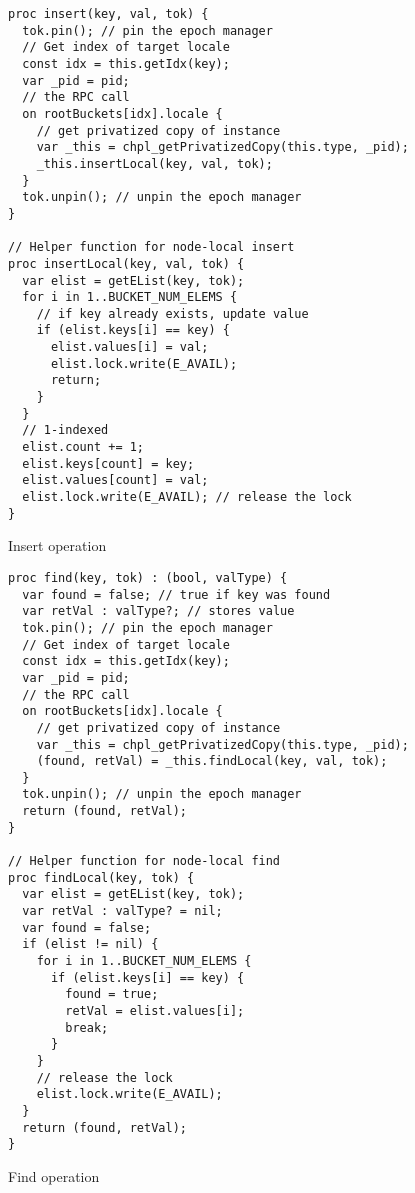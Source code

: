 \documentclass[letterpaper, 10 pt, conference]{ieeeconf}  %
\begin{document}
\begin{listing}
 \begin{verbatim}
proc insert(key, val, tok) {
  tok.pin(); // pin the epoch manager
  // Get index of target locale
  const idx = this.getIdx(key);
  var _pid = pid;
  // the RPC call
  on rootBuckets[idx].locale {
    // get privatized copy of instance
    var _this = chpl_getPrivatizedCopy(this.type, _pid);
    _this.insertLocal(key, val, tok);
  }
  tok.unpin(); // unpin the epoch manager
}

// Helper function for node-local insert
proc insertLocal(key, val, tok) {
  var elist = getEList(key, tok);
  for i in 1..BUCKET_NUM_ELEMS {
    // if key already exists, update value
    if (elist.keys[i] == key) {
      elist.values[i] = val;
      elist.lock.write(E_AVAIL);
      return;
    }
  }
  // 1-indexed
  elist.count += 1;
  elist.keys[count] = key;
  elist.values[count] = val;
  elist.lock.write(E_AVAIL); // release the lock
}
\end{verbatim}
\caption{Insert operation}
\label{lst:insert}
\end{listing}

\begin{listing}
 \begin{verbatim}
proc find(key, tok) : (bool, valType) {
  var found = false; // true if key was found
  var retVal : valType?; // stores value
  tok.pin(); // pin the epoch manager
  // Get index of target locale
  const idx = this.getIdx(key);
  var _pid = pid;
  // the RPC call
  on rootBuckets[idx].locale {
    // get privatized copy of instance
    var _this = chpl_getPrivatizedCopy(this.type, _pid);
    (found, retVal) = _this.findLocal(key, val, tok);
  }
  tok.unpin(); // unpin the epoch manager
  return (found, retVal);
}

// Helper function for node-local find
proc findLocal(key, tok) {
  var elist = getEList(key, tok);
  var retVal : valType? = nil;
  var found = false;
  if (elist != nil) {
    for i in 1..BUCKET_NUM_ELEMS {
      if (elist.keys[i] == key) {
        found = true;
        retVal = elist.values[i];
        break;
      }
    }
    // release the lock
    elist.lock.write(E_AVAIL);
  }
  return (found, retVal);
}
\end{verbatim}
\caption{Find operation}
\label{lst:lookup}
\end{listing}
\end{document}
